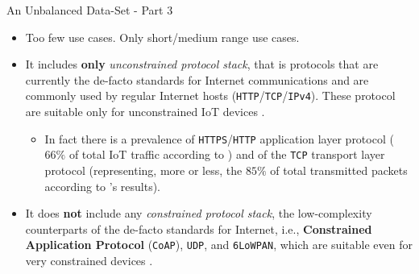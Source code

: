 \documentclass[13.5pt]{beamer}
\begin{document}
\begin{frame}{An Unbalanced Data-Set - Part 3}

\begin{itemize}
\justifying
\item Too few use cases. Only short/medium range use cases.

\item It includes \textbf{only} \textit{unconstrained protocol stack}, that is protocols that are currently the de-facto standards for Internet communications and are commonly used by regular Internet hosts (\texttt{HTTP}/\texttt{TCP}/\texttt{IPv4}). These protocol are suitable only for unconstrained IoT devices \cite{IOTCITY}.

\begin{itemize}
\justifying
\item In fact there is a prevalence of \texttt{HTTPS}/\texttt{HTTP} application layer protocol ($66\%$ of total IoT traffic according to \citet{ITPAReport}) and of the \texttt{TCP} transport layer protocol (representing, more or less, the $85\%$ of total transmitted packets according to \citet{ITPAReport}'s results).
\end{itemize}

\item It does \textbf{not} include any \textit{constrained protocol stack}, the low-complexity counterparts of the de-facto standards for Internet, i.e., \textbf{Constrained Application Protocol} (\texttt{CoAP}), \texttt{UDP}, and \texttt{6LoWPAN}, which are suitable even for very constrained devices \cite{IOTCITY}.

\end{itemize}

\end{frame} 
\end{document}
